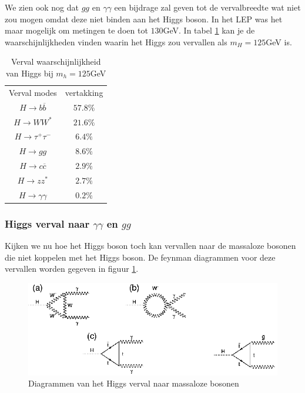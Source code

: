 \documentclass[../main.tex]{subfiles}
\begin{document}
We zien ook nog dat $gg$ en $\gamma\gamma$ een bijdrage zal geven tot de vervalbreedte wat niet zou mogen omdat deze niet binden aan het Higgs boson. In het LEP was het maar mogelijk om metingen te doen tot $130$GeV. In tabel \ref{tab:h_verval_125_gev} kan je de waarschijnlijkheden vinden waarin het Higgs zou vervallen als $m_H=125$GeV is.

\begin{table}[h]
    \centering
    \caption{Verval waarschijnlijkheid van Higgs bij $m_h=125$GeV}
    \label{tab:h_verval_125_gev}
    \begin{tabular}{cc}
        Verval modes & vertakking \\
        $H\rightarrow b\overline b$ & $57.8\%$ \\
        $H\rightarrow WW^*$ & $21.6\%$ \\
        $H\rightarrow \tau^+\tau^-$ & $6.4\%$ \\
        $H\rightarrow gg$ & $8.6\%$ \\
        $H\rightarrow c\overline c$ & $2.9\%$ \\
        $H\rightarrow zz^*$ & $2.7\%$ \\
        $H\rightarrow \gamma\gamma$ & $0.2\%$ \\
    \end{tabular}
\end{table}

\subsubsection{Higgs verval naar $\gamma\gamma$ en $gg$}%
\label{ssub:higgs_verval_naar_gammagamma_en_gg_}

Kijken we nu hoe het Higgs boson toch kan vervallen naar de massaloze bosonen die niet koppelen met het Higgs boson. De feynman diagrammen voor deze vervallen worden gegeven in figuur \ref{fig:higgs_boson/h_naar_foton_gluon}.

\begin{figure}[h]
    \centering
    \includegraphics[width=0.8\linewidth]{higgs_boson/h_naar_foton_gluon.png}
    \caption{Diagrammen van het Higgs verval naar massaloze bosonen}%
    \label{fig:higgs_boson/h_naar_foton_gluon}
\end{figure}
\end{document}

